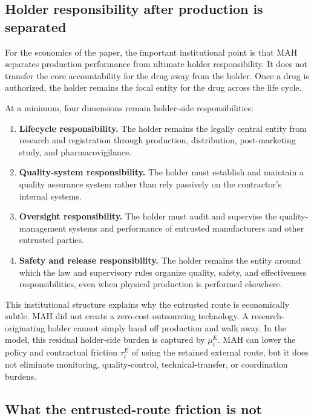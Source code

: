 \documentclass[12pt]{article}
\newcommand{\1}{\mathbf{1}}
\begin{document}
\subsection{Holder responsibility after production is separated}

For the economics of the paper, the important institutional point is that MAH separates production performance from ultimate holder responsibility. It does not transfer the core accountability for the drug away from the holder. Once a drug is authorized, the holder remains the focal entity for the drug across the life cycle.

At a minimum, four dimensions remain holder-side responsibilities:
\begin{enumerate}
    \item \textbf{Lifecycle responsibility.} The holder remains the legally central entity from research and registration through production, distribution, post-marketing study, and pharmacovigilance.
    \item \textbf{Quality-system responsibility.} The holder must establish and maintain a quality assurance system rather than rely passively on the contractor's internal systems.
    \item \textbf{Oversight responsibility.} The holder must audit and supervise the quality-management systems and performance of entrusted manufacturers and other entrusted parties.
    \item \textbf{Safety and release responsibility.} The holder remains the entity around which the law and supervisory rules organize quality, safety, and effectiveness responsibilities, even when physical production is performed elsewhere.
\end{enumerate}

This institutional structure explains why the entrusted route is economically subtle. MAH did not create a zero-cost outsourcing technology. A research-originating holder cannot simply hand off production and walk away. In the model, this residual holder-side burden is captured by $\mu_i^E$. MAH can lower the policy and contractual friction $\tau_i^E$ of using the retained external route, but it does not eliminate monitoring, quality-control, technical-transfer, or coordination burdens.

\subsection{What the entrusted-route friction is not}
\end{document}
